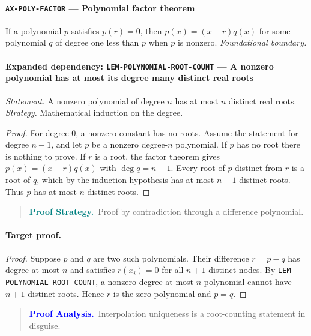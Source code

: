 \documentclass[10pt]{article}
\newcommand{\pidraw}[1]{\begingroup\urlstyle{tt}\nolinkurl{#1}\endgroup}
\newcommand{\pidref}[1]{\hyperref[prf:#1]{\pidraw{#1}}}
\newcommand{\pid}[1]{\pidref{#1}}
\theoremstyle{definition}
\theoremstyle{remark}
\newenvironment{proofstrategy}
{\begin{quote}\small\noindent\textbf{\textcolor{teal}{Proof Strategy.}}\ }
{\end{quote}}
\newenvironment{proofanalysis}
{\begin{quote}\small\noindent\textbf{\textcolor{blue}{Proof Analysis.}}\ }
{\end{quote}}
\begin{document}
\paragraph{\pidraw{AX-POLY-FACTOR} --- Polynomial factor theorem}
If a polynomial $p$ satisfies $p(r)=0$, then $p(x)=(x-r)q(x)$ for some polynomial $q$ of degree one less than $p$ when $p$ is nonzero.
\textit{Foundational boundary.}

\paragraph{Expanded dependency: \pidraw{LEM-POLYNOMIAL-ROOT-COUNT} --- A nonzero polynomial has at most its degree many distinct real roots}
\textit{Statement.} A nonzero polynomial of degree $n$ has at most $n$ distinct real roots.
\textit{Strategy.} Mathematical induction on the degree.
\begin{proof}For degree $0$, a nonzero constant has no roots. Assume the statement for degree
$n-1$, and let $p$ be a nonzero degree-$n$ polynomial. If $p$ has no root there is
nothing to prove. If $r$ is a root, the factor theorem gives
$p(x)=(x-r)q(x)$ with $\deg q=n-1$. Every root of $p$ distinct from $r$ is a
root of $q$, which by the induction hypothesis has at most $n-1$ distinct roots.
Thus $p$ has at most $n$ distinct roots.\end{proof}

\begin{proofstrategy}Proof by contradiction through a difference polynomial.\end{proofstrategy}

\paragraph{Target proof.}

\begin{proof}

Suppose $p$ and $q$ are two such polynomials. Their difference
$r=p-q$ has degree at most $n$ and satisfies
$r(x_i)=0$ for all $n+1$ distinct nodes. By
\pid{LEM-POLYNOMIAL-ROOT-COUNT}, a nonzero degree-at-most-$n$ polynomial cannot
have $n+1$ distinct roots. Hence $r$ is the zero polynomial and $p=q$.

\end{proof}

\begin{proofanalysis}Interpolation uniqueness is a root-counting statement in disguise.\end{proofanalysis}
\end{document}
